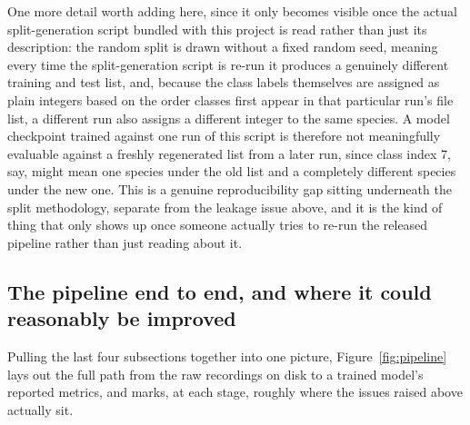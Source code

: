 \documentclass[11pt]{article}
\begin{document}
One more detail worth adding here, since it only becomes visible once the actual split-generation script bundled with this project is read rather than just its description: the random split is drawn without a fixed random seed, meaning every time the split-generation script is re-run it produces a genuinely different training and test list, and, because the class labels themselves are assigned as plain integers based on the order classes first appear in that particular run's file list, a different run also assigns a different integer to the same species. A model checkpoint trained against one run of this script is therefore not meaningfully evaluable against a freshly regenerated list from a later run, since class index 7, say, might mean one species under the old list and a completely different species under the new one. This is a genuine reproducibility gap sitting underneath the split methodology, separate from the leakage issue above, and it is the kind of thing that only shows up once someone actually tries to re-run the released pipeline rather than just reading about it.

\subsection{The pipeline end to end, and where it could reasonably be improved}

Pulling the last four subsections together into one picture, Figure~\ref{fig:pipeline} lays out the full path from the raw recordings on disk to a trained model's reported metrics, and marks, at each stage, roughly where the issues raised above actually sit.
\end{document}
